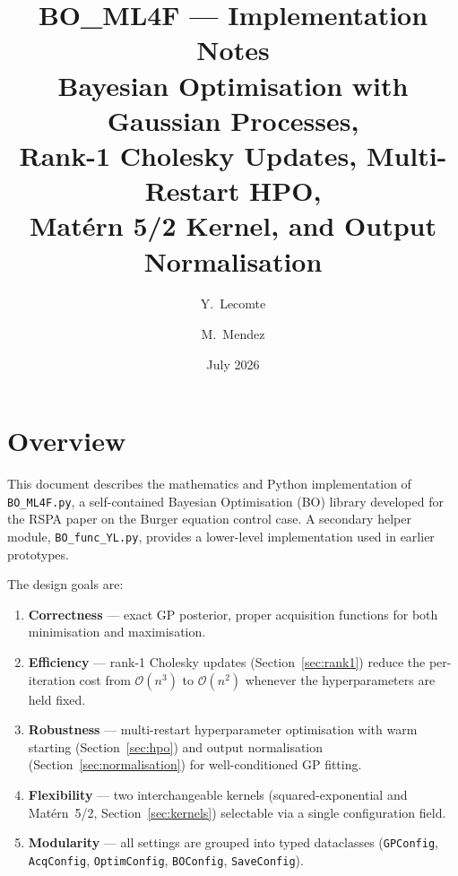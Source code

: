 \documentclass[11pt,a4paper]{article}
\theoremstyle{remark}
\newcommand{\codefile}[1]{\texttt{#1}}
\begin{document}
\title{\textbf{BO\_ML4F --- Implementation Notes}\\[4pt]
       \large Bayesian Optimisation with Gaussian Processes,\\
       Rank-1 Cholesky Updates, Multi-Restart HPO,\\
       Mat\'{e}rn 5/2 Kernel, and Output Normalisation}
\author{Y.\ Lecomte \and M.\ Mendez}
\date{July 2026}
\maketitle
\tableofcontents
\bigskip

\section{Overview}

This document describes the mathematics and Python implementation of
\codefile{BO\_ML4F.py}, a self-contained Bayesian Optimisation (BO) library
developed for the RSPA paper on the Burger equation control case.
A secondary helper module, \codefile{BO\_func\_YL.py}, provides a lower-level
implementation used in earlier prototypes.

The design goals are:
\begin{enumerate}
  \item \textbf{Correctness} --- exact GP posterior, proper acquisition functions
        for both minimisation and maximisation.
  \item \textbf{Efficiency} --- rank-1 Cholesky updates (Section~\ref{sec:rank1})
        reduce the per-iteration cost from $\mathcal{O}(n^3)$ to
        $\mathcal{O}(n^2)$ whenever the hyperparameters are held fixed.
  \item \textbf{Robustness} --- multi-restart hyperparameter optimisation with
        warm starting (Section~\ref{sec:hpo}) and output normalisation
        (Section~\ref{sec:normalisation}) for well-conditioned GP fitting.
  \item \textbf{Flexibility} --- two interchangeable kernels (squared-exponential
        and Mat\'{e}rn~5/2, Section~\ref{sec:kernels}) selectable via a single
        configuration field.
  \item \textbf{Modularity} --- all settings are grouped into typed dataclasses
        (\codefile{GPConfig}, \codefile{AcqConfig}, \codefile{OptimConfig},
        \codefile{BOConfig}, \codefile{SaveConfig}).
\end{enumerate}
\end{document}
